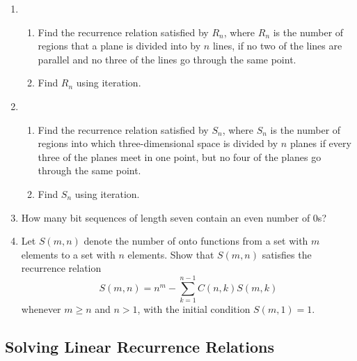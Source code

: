 \documentclass{../../cls/sig-alternate-05-2015}
\begin{document}
\begin{enumerate}
\item \begin{enumerate}
    \item Find the recurrence relation satisfied by $R_n$,
    where $R_n$ is the number of regions that a plane is divided into by $n$ lines,
    if no two of the lines are parallel and no three of the lines go through the same point.
    \item Find $R_n$ using iteration.
\end{enumerate}

\item \begin{enumerate}
    \item Find the recurrence relation satisfied by $S_n$,
    where $S_n$ is the number of regions into which three-dimensional space is divided by $n$ planes if every three of the planes meet in one point,
    but no four of the planes go through the same point.
    \item Find $S_n$ using iteration.
\end{enumerate}

\item How many bit sequences of length seven contain an even
number of $0$s?

 \item Let $S(m, n)$ denote the number of onto functions from
a set with $m$ elements to a set with $n$ elements. Show
that $S(m, n)$ satisfies the recurrence relation
\begin{equation}
S(m, n) = n^m - \sum_{k=1}^{n-1} C(n, k)S(m, k)
\end{equation}
whenever $m \geq n$ and $n > 1$, with the initial condition
$S(m, 1) = 1$.

\end{enumerate}

\subsection{Solving Linear Recurrence Relations}


\end{document}
